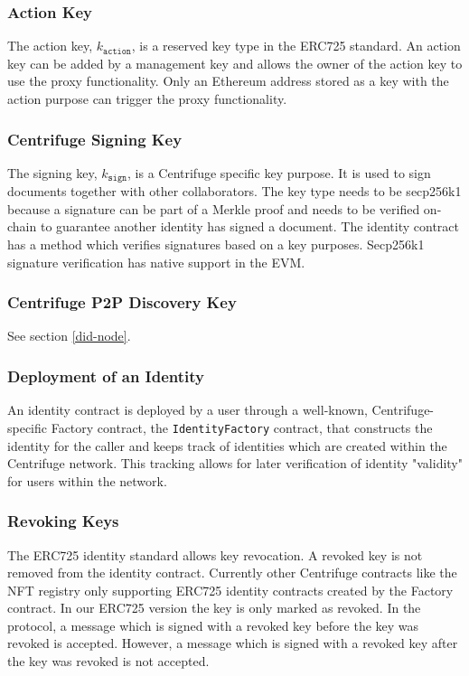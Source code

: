 \subsubsection{Action Key} 
The action key, $k_\mathtt{action}$, is a reserved key type in the ERC725 standard. An action key can be added by a management key and allows the owner of the action key to use the proxy functionality.  Only an Ethereum address stored as a key with the action purpose can trigger the proxy functionality. \\
\subsubsection{Centrifuge Signing Key}
The signing key, $k_\mathtt{sign}$, is a Centrifuge specific key purpose. It is used to sign documents together with other collaborators. The key type needs to be secp256k1 because a signature can be part of a Merkle proof and needs to be verified on-chain to guarantee another identity has signed a document. The identity contract has a method which verifies signatures based on a key purposes. Secp256k1 signature verification has native support in the EVM.
\subsubsection{Centrifuge P2P Discovery Key}
See section \ref{did-node}.
\subsubsection{Deployment of an Identity}
An identity contract is deployed by a user through a well-known, Centrifuge-specific Factory contract, the  \texttt{IdentityFactory} contract, that constructs the identity for the caller and keeps track of identities which are created within the Centrifuge network. This tracking allows for later verification of identity "validity" for users within the network.
\subsubsection{Revoking Keys}
The ERC725 identity standard allows key revocation. A revoked key is not removed from the identity contract.  Currently other Centrifuge contracts like the NFT registry only supporting ERC725 identity contracts created by the Factory contract. In our ERC725 version the key is only marked as revoked. In the protocol, a message which is signed with a revoked key before the key was revoked is accepted. However, a message which is signed with a revoked key after the key was revoked is not accepted.







